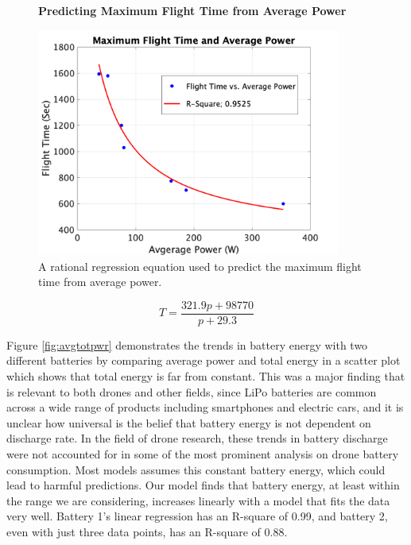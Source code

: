 \documentclass{article}
\begin{document}
\begin{figure}[!h]
  \centering
  \large{\textbf{Predicting Maximum Flight Time from Average Power}}\par
  \includegraphics[width = 100mm]{images/FlightTime.png}
  \caption{A rational regression equation used to predict the maximum flight time from average power.}
  \label{fig:flighttime}
\end{figure}

\begin{equation}
T={\frac {321.9p + 98770}{p + 29.3}}
\end{equation}

Figure \ref{fig:avgtotpwr} demonstrates the trends in battery energy with two different batteries by comparing average power and total energy in a scatter plot which shows that total energy is far from constant. This was a major finding that is relevant to both drones and other fields, since LiPo batteries are common across a wide range of products including smartphones and electric cars, and it is unclear how universal is the belief that battery energy is not dependent on discharge rate. In the field of drone research, these trends in battery discharge were not accounted for in some of the most prominent analysis on drone battery consumption. Most models assumes this constant battery energy, which could lead to harmful predictions. Our model finds that battery energy, at least within the range we are considering, increases linearly with a model that fits the data very well. Battery 1's linear regression has an R-square of 0.99, and battery 2, even with just three data points, has an R-square of 0.88.
\end{document}
